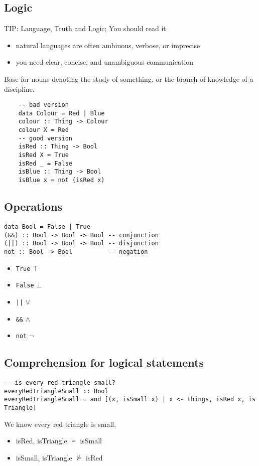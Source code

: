 \documentclass{article}
\theoremstyle{sltheorem}
\begin{document}
\subsection{Logic}
TIP: Language, Truth and Logic; You should read it
\begin{itemize}
    \item natural languages are often ambiuous, verbose, or imprecise
    \item you need clear, concise, and unambiguous communication   
\end{itemize}
Base for nouns denoting the study of something, or the branch of knowledge of a discipline.
\begin{verbatim}
    -- bad version
    data Colour = Red | Blue
    colour :: Thing -> Colour
    colour X = Red
    -- good version
    isRed :: Thing -> Bool
    isRed X = True
    isRed _ = False
    isBlue :: Thing -> Bool
    isBlue x = not (isRed x)
\end{verbatim}
\subsection{Operations}
\begin{verbatim}
data Bool = False | True
(&&) :: Bool -> Bool -> Bool -- conjunction
(||) :: Bool -> Bool -> Bool -- disjunction
not :: Bool -> Bool          -- negation
\end{verbatim}
\begin{itemize}
    \item \texttt{True} $\top$
    \item \texttt{False} $\bot$
    \item \texttt{||} $\vee$
    \item \texttt{\&\&} $\wedge$
    \item \texttt{not} $\neg$
\end{itemize}
\subsection{Comprehension for logical statements}
\begin{verbatim}
-- is every red triangle small?
everyRedTriangleSmall :: Bool
everyRedTriangleSmall = and [(x, isSmall x) | x <- things, isRed x, is Triangle]
\end{verbatim}
We know every red triangle is small.
\begin{itemize}
    \item isRed, isTriangle $\vDash$ isSmall
    \item isSmall, isTriangle $\not\vDash$ isRed
\end{itemize}
\end{document}
